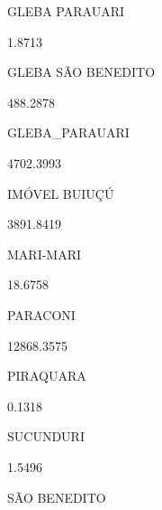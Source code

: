 \documentclass[
  letterpaper,
]{report}
\begin{document}
\n    

\n    

\n      

GLEBA PARAUARI

\n      

1.8713

\n    

\n    

\n      

GLEBA SÃO BENEDITO

\n      

488.2878

\n    

\n    

\n      

GLEBA\_PARAUARI

\n      

4702.3993

\n    

\n    

\n      

IMÓVEL BUIUÇÚ

\n      

3891.8419

\n    

\n    

\n      

MARI-MARI

\n      

18.6758

\n    

\n    

\n      

PARACONI

\n      

12868.3575

\n    

\n    

\n      

PIRAQUARA

\n      

0.1318

\n    

\n    

\n      

SUCUNDURI

\n      

1.5496

\n    

\n    

\n      

SÃO BENEDITO

\n      
\end{document}
